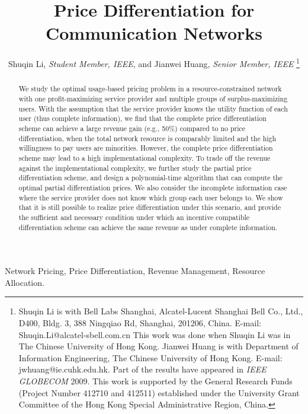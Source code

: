 \documentclass[twocolumn,10pt,twosided]{IEEEtran}
\begin{document}
\newcommand{\revh}[1]{{\color{magenta}#1}}
\newcommand{\rev}[1]{{\color{black}#1}} \newcommand{\com}[1]{\textbf{\color{red} (COMMENT: #1)}} \newcommand{\response}[1]{\textbf{\color{green} (RESPONSE: #1)}} \else
\newcommand{\revh}[1]{#1}
\newcommand{\rev}[1]{#1}
\newcommand{\com}[1]{}
\newcommand{\response}[1]{}
\fi

\title{Price Differentiation for Communication Networks}


\author{Shuqin Li, \emph{Student Member, IEEE},  and Jianwei Huang, \emph{Senior Member, IEEE} \thanks{\IEEEcompsocthanksitem Shuqin Li is with Bell Labs Shanghai, Alcatel-Lucent Shanghai Bell Co., Ltd., D400, Bldg. 3, 388 Ningqiao Rd, Shanghai, 201206, China.
E-mail: Shuqin.Li@alcatel-sbell.com.cn This work was done when Shuqin Li was in The Chinese University of Hong Kong.
\IEEEcompsocthanksitem Jianwei Huang is with Department of Information Engineering, The  Chinese University of Hong Kong. E-mail: jwhuang@ie.cuhk.edu.hk.
\IEEEcompsocthanksitem Part of the results have appeared in \emph{IEEE GLOBECOM} 2009\cite{li2009revenue}. This work is supported by the General Research Funds (Project Number 412710 and 412511) established under the University Grant Committee of the Hong Kong Special Administrative Region, China.
}}

\maketitle

\begin{abstract}
We study the optimal usage-based pricing problem in a resource-constrained network with one profit-maximizing \rev{service provider} and multiple groups of surplus-maximizing users. With the assumption that the \rev{service provider} knows the utility function of each user (thus complete information), we find that the complete price differentiation scheme can achieve a large revenue gain (e.g., 50\%) compared to no price differentiation, when the total network resource is comparably limited and the high willingness to pay users are minorities. However, the complete price differentiation scheme may lead to a high implementational complexity. To trade off the revenue against the  implementational complexity, we further study the partial price differentiation scheme, and design a polynomial-time algorithm that can compute the optimal partial differentiation prices. We also consider the incomplete information case where the service provider does not know which group each user belongs to. We show that it is still possible to realize price differentiation under this scenario, and provide the sufficient and necessary condition under which an incentive compatible differentiation scheme can achieve the same revenue as under complete information.
\end{abstract}
\begin{IEEEkeywords}
Network Pricing, Price Differentiation, Revenue Management, Resource Allocation.
\end{IEEEkeywords}
\end{document}
